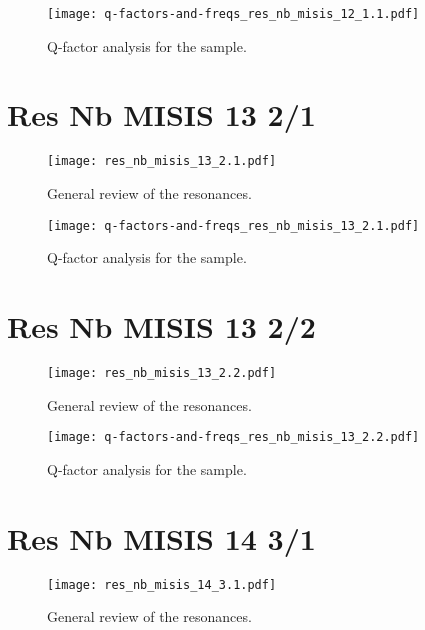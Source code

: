 \documentclass[12pt]{article}
\numberwithin{equation}{section}
\numberwithin{figure}{section}
\begin{document}
\begin{figure}[h!]
\centering
\texttt{[image: q-factors-and-freqs\_res\_nb\_misis\_12\_1.1.pdf]}

\caption{Q-factor analysis for the sample.}
\end{figure}

\section{Res Nb MISIS 13 2/1}

\begin{figure}[h!]
\centering
\texttt{[image: res\_nb\_misis\_13\_2.1.pdf]}

\caption{ General review of the resonances.}
\end{figure}

\begin{figure}[h!]
\centering
\texttt{[image: q-factors-and-freqs\_res\_nb\_misis\_13\_2.1.pdf]}

\caption{Q-factor analysis for the sample.}
\end{figure}

\section{Res Nb MISIS 13 2/2}

\begin{figure}[h!]
\centering
\texttt{[image: res\_nb\_misis\_13\_2.2.pdf]}

\caption{ General review of the resonances.}
\end{figure}

\begin{figure}[h!]
\centering
\texttt{[image: q-factors-and-freqs\_res\_nb\_misis\_13\_2.2.pdf]}

\caption{Q-factor analysis for the sample.}
\end{figure}

\section{Res Nb MISIS 14 3/1}

\begin{figure}[h!]
\centering
\texttt{[image: res\_nb\_misis\_14\_3.1.pdf]}

\caption{ General review of the resonances.}
\end{figure}
\end{document}

